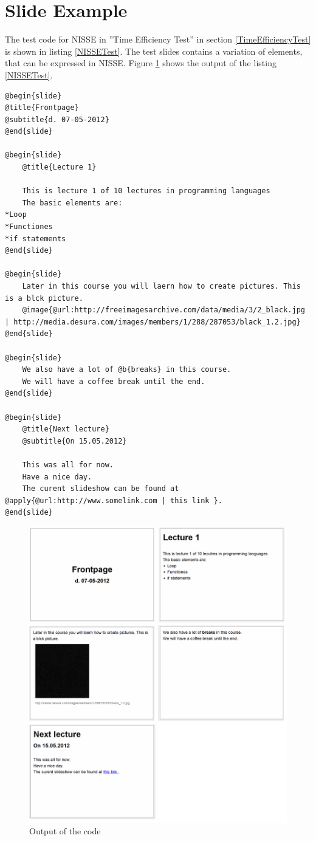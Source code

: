\section{Slide Example}
\label{ASlideExample}
The test code for NISSE in ''Time Efficiency Test'' in section \ref{TimeEfficiencyTest} is shown in listing \ref{NISSETest}.
The test slides contains a variation of elements, that can be expressed in NISSE.
Figure \ref{fig:EfficiencyTest} shows the output of the listing \ref{NISSETest}.

\begin{lstlisting}[frame=single, label=NISSETest]
@begin{slide}
@title{Frontpage}
@subtitle{d. 07-05-2012}
@end{slide}

@begin{slide}
    @title{Lecture 1}
    
    This is lecture 1 of 10 lectures in programming languages
    The basic elements are:
*Loop
*Functiones
*if statements
@end{slide}

@begin{slide}
    Later in this course you will laern how to create pictures. This is a blck picture.
    @image{@url:http://freeimagesarchive.com/data/media/3/2_black.jpg | http://media.desura.com/images/members/1/288/287053/black_1.2.jpg}
@end{slide}

@begin{slide}
    We also have a lot of @b{breaks} in this course.
    We will have a coffee break until the end.
@end{slide}

@begin{slide}
    @title{Next lecture}
    @subtitle{On 15.05.2012}
    
    This was all for now.
    Have a nice day.
    The curent slideshow can be found at @apply{@url:http://www.somelink.com | this link }.
@end{slide}

\end{lstlisting}


\begin{figure}[htbp]
	\centering
		\includegraphics[width=1.00\textwidth]{./images/EfficiencyTest.png}
	\caption{Output of the code}
	\label{fig:EfficiencyTest}
\end{figure}

